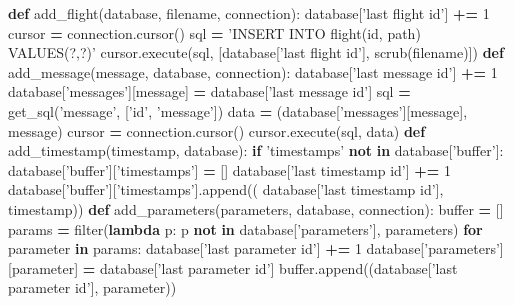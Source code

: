 \documentclass[12pt,oneside]{reedthesis}
\newenvironment{Shaded}{\begin{snugshade}}{\end{snugshade}}
\newcommand{\KeywordTok}[1]{\textcolor[rgb]{0.13,0.29,0.53}{\textbf{#1}}}
\newcommand{\DecValTok}[1]{\textcolor[rgb]{0.00,0.00,0.81}{#1}}
\newcommand{\StringTok}[1]{\textcolor[rgb]{0.31,0.60,0.02}{#1}}
\newcommand{\ControlFlowTok}[1]{\textcolor[rgb]{0.13,0.29,0.53}{\textbf{#1}}}
\newcommand{\OperatorTok}[1]{\textcolor[rgb]{0.81,0.36,0.00}{\textbf{#1}}}
\newcommand{\BuiltInTok}[1]{#1}
\newcommand{\NormalTok}[1]{#1}
\theoremstyle{definition}
\theoremstyle{definition}
\theoremstyle{definition}
\theoremstyle{remark}
\begin{document}
\begin{Shaded}
\begin{Highlighting}[]
{{{{{\KeywordTok{def}\NormalTok{ add_flight(database, filename, connection):}
\NormalTok{    database[}\StringTok{'last flight id'}\NormalTok{] }\OperatorTok{+=} \DecValTok{1}    
\NormalTok{    cursor }\OperatorTok{=}\NormalTok{ connection.cursor()}
\NormalTok{    sql }\OperatorTok{=} \StringTok{'INSERT INTO flight(id, path) VALUES(?,?)'}
\NormalTok{    cursor.execute(sql, [database[}\StringTok{'last flight id'}\NormalTok{], scrub(filename)])}
\KeywordTok{def}\NormalTok{ add_message(message, database, connection):}
\NormalTok{    database[}\StringTok{'last message id'}\NormalTok{] }\OperatorTok{+=} \DecValTok{1}
\NormalTok{    database[}\StringTok{'messages'}\NormalTok{][message] }\OperatorTok{=}\NormalTok{ database[}\StringTok{'last message id'}\NormalTok{]}
\NormalTok{    sql }\OperatorTok{=}\NormalTok{ get_sql(}\StringTok{'message'}\NormalTok{, [}\StringTok{'id'}\NormalTok{, }\StringTok{'message'}\NormalTok{])}
\NormalTok{    data }\OperatorTok{=}\NormalTok{ (database[}\StringTok{'messages'}\NormalTok{][message], message)}
\NormalTok{    cursor }\OperatorTok{=}\NormalTok{ connection.cursor()}
\NormalTok{    cursor.execute(sql, data)}
\KeywordTok{def}\NormalTok{ add_timestamp(timestamp, database):}
    \ControlFlowTok{if} \StringTok{'timestamps'} \KeywordTok{not} \KeywordTok{in}\NormalTok{ database[}\StringTok{'buffer'}\NormalTok{]:}
\NormalTok{        database[}\StringTok{'buffer'}\NormalTok{][}\StringTok{'timestamps'}\NormalTok{] }\OperatorTok{=}\NormalTok{ []}
\NormalTok{    database[}\StringTok{'last timestamp id'}\NormalTok{] }\OperatorTok{+=} \DecValTok{1}
\NormalTok{    database[}\StringTok{'buffer'}\NormalTok{][}\StringTok{'timestamps'}\NormalTok{].append((}
\NormalTok{      database[}\StringTok{'last timestamp id'}\NormalTok{], timestamp))}
\KeywordTok{def}\NormalTok{ add_parameters(parameters, database, connection):}
    \BuiltInTok{buffer} \OperatorTok{=}\NormalTok{ []}
\NormalTok{    params }\OperatorTok{=} \BuiltInTok{filter}\NormalTok{(}\KeywordTok{lambda}\NormalTok{ p: p }\KeywordTok{not} \KeywordTok{in} 
\NormalTok{      database[}\StringTok{'parameters'}\NormalTok{], parameters)}
    \ControlFlowTok{for}\NormalTok{ parameter }\KeywordTok{in}\NormalTok{ params:}
\NormalTok{        database[}\StringTok{'last parameter id'}\NormalTok{] }\OperatorTok{+=} \DecValTok{1}
\NormalTok{        database[}\StringTok{'parameters'}\NormalTok{][parameter] }\OperatorTok{=}\NormalTok{ database[}\StringTok{'last parameter id'}\NormalTok{]}
        \BuiltInTok{buffer}\NormalTok{.append((database[}\StringTok{'last parameter id'}\NormalTok{], parameter))}
    
}}}}}
\end{Highlighting}
\end{Shaded}
\end{document}
